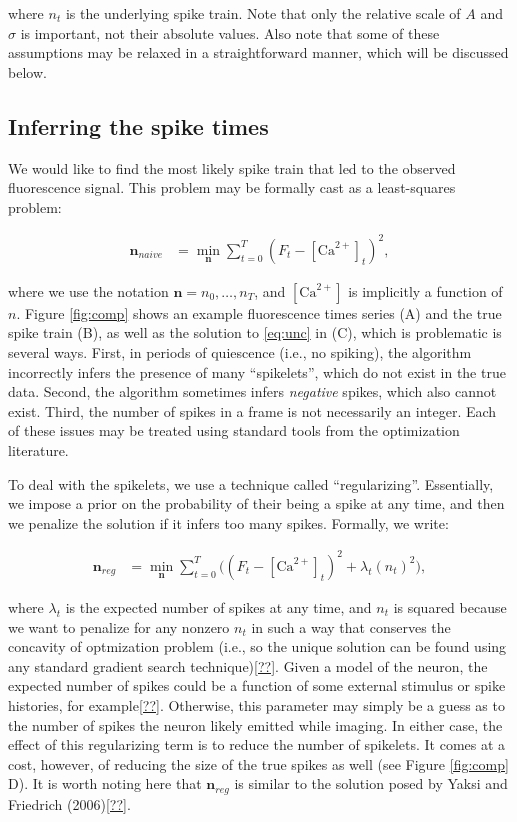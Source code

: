 \documentclass[12pt]{article}
\providecommand{\ve}[1]{\boldsymbol{#1}}
\providecommand{\ve}[1]{\boldsymbol{#1}}
\newcommand{\Ca}{[\text{Ca}^{2+}]}
\begin{document}
\noindent where $n_t$ is the underlying spike train. Note that only the relative scale of $A$ and $\sigma$ is important, not their absolute values. Also note that some of these assumptions may be relaxed in a straightforward manner, which will be discussed below.


\subsection{Inferring the spike times}

We would like to find the most likely spike train that led to the observed fluorescence signal. This problem may be formally cast as a least-squares problem: 

\begin{align} \label{eq:unc}
\ve{n}_{naive} &= \min_{\ve{n}} \sum_{t=0}^T (F_t - \Ca_t)^2,
\end{align}

\noindent where we use the notation $\ve{n}=n_0,\ldots, n_T$, and $\Ca$ is implicitly a function of $n$. Figure \ref{fig:comp} shows an example fluorescence times series (A) and the true spike train (B), as well as the solution to \eqref{eq:unc} in (C), which is problematic is several ways.  First, in periods of quiescence (i.e., no spiking), the algorithm incorrectly infers the presence of many ``spikelets'', which do not exist in the true data.  Second, the algorithm sometimes infers \emph{negative} spikes, which also cannot exist. Third, the number of spikes in a frame is not necessarily an integer.  Each of these issues may be treated using standard tools from the optimization literature.

To deal with the spikelets, we use a technique called ``regularizing''.  Essentially, we impose a prior on the probability of their being a spike at any time, and then we penalize the solution if it infers too many spikes.  Formally, we write:

\begin{align} \label{eq:reg}
\ve{n}_{reg} &= \min_{\ve{n}} \sum_{t=0}^T \big((F_t - \Ca_t)^2 + \lambda_t (n_t)^2 \big),
\end{align}

\noindent where $\lambda_t$ is the expected number of spikes at any time, and $n_t$ is squared because we want to penalize for any nonzero $n_t$ in such a way that conserves the concavity of optmization problem (i.e., so the unique solution can be found using any standard gradient search technique)\ref{??}.  Given a model of the neuron, the expected number of spikes could be a function of some external stimulus or spike histories, for example\ref{??}.  Otherwise, this parameter may simply be a guess as to the number of spikes the neuron likely emitted while imaging.  In either case, the effect of this regularizing term is to reduce the number of spikelets.  It comes at a cost, however, of reducing the size of the true spikes as well (see Figure \ref{fig:comp} D). It is worth noting here that $\ve{n}_{reg}$ is similar to the solution posed by Yaksi and Friedrich (2006)\ref{??}.
\end{document}
